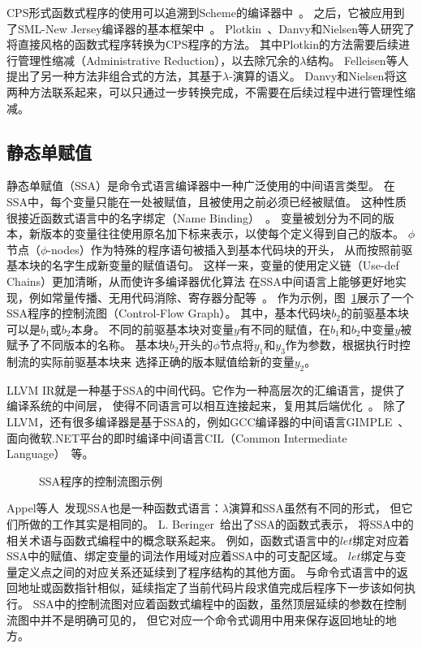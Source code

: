 CPS形式函数式程序的使用可以追溯到Scheme的编译器中~\cite{steele1978rabbit}。
之后，它被应用到了SML-New Jersey编译器的基本框架中~\cite{shao1995type}。
Plotkin~\cite{plotkin1977lcf}、Danvy和Nielsen\cite{danvy2007one}等人研究了将直接风格的函数式程序转换为CPS程序的方法。
其中Plotkin的方法需要后续进行管理性缩减（Administrative Reduction），以去除冗余的$\lambda$结构。
Felleisen等人提出了另一种方法非组合式的方法，其基于$\lambda$-演算的语义。
Danvy和Nielsen将这两种方法联系起来，可以只通过一步转换完成，不需要在后续过程中进行管理性缩减。


\subsection{静态单赋值} \label{sec:bg_ssa}

静态单赋值（SSA）是命令式语言编译器中一种广泛使用的中间语言类型。
在SSA中，每个变量只能在一处被赋值，且被使用之前必须已经被赋值。
这种性质很接近函数式语言中的名字绑定（Name Binding）~\cite{ssabook}。
变量被划分为不同的版本，新版本的变量往往使用原名加下标来表示，以使每个定义得到自己的版本。
$\phi$节点（$\phi$-nodes）作为特殊的程序语句被插入到基本代码块的开头，
从而按照前驱基本块的名字生成新变量的赋值语句。
这样一来，变量的使用定义链（Use-def Chains）更加清晰，从而使许多编译器优化算法
在SSA中间语言上能够更好地实现，例如常量传播、无用代码消除、寄存器分配等~\cite{ssabook,kelsey1995correspondence}。
作为示例，图~\ref{ssacfg}展示了一个SSA程序的控制流图（Control-Flow Graph）。
其中，基本代码块$b_2$的前驱基本块可以是$b_1$或$b_2$本身。
不同的前驱基本块对变量$y$有不同的赋值，在$b_1$和$b_2$中变量$y$被赋予了不同版本的名称。
基本块$b_2$开头的$\phi$节点将$y_1$和$y_3$作为参数，根据执行时控制流的实际前驱基本块来
选择正确的版本赋值给新的变量$y_2$。

LLVM IR就是一种基于SSA的中间代码。它作为一种高层次的汇编语言，提供了编译系统的中间层，
使得不同语言可以相互连接起来，复用其后端优化~\cite{lattner2006introduction}。
除了LLVM，还有很多编译器是基于SSA的，例如GCC编译器的中间语言GIMPLE~\cite{callanan2007extending}、
面向微软.NET平台的即时编译中间语言CIL（Common Intermediate Language）~\cite{thai2003net}等。

\begin{figure}[htbp]
    \centering
    
    \caption{SSA程序的控制流图示例}\label{ssacfg}
\end{figure}

Appel等人~\cite{appel1998ssa}发现SSA也是一种函数式语言：$\lambda$演算和SSA虽然有不同的形式，
但它们所做的工作其实是相同的。
L. Beringer~\cite{ssabook}给出了SSA的函数式表示，
将SSA中的相关术语与函数式编程中的概念联系起来。
例如，函数式语言中的$let$绑定对应着SSA中的赋值、绑定变量的词法作用域对应着SSA中的可支配区域。
$let$绑定与变量定义点之间的对应关系还延续到了程序结构的其他方面。
与命令式语言中的返回地址或函数指针相似，延续指定了当前代码片段求值完成后程序下一步该如何执行。
SSA中的控制流图对应着函数式编程中的函数，虽然顶层延续的参数在控制流图中并不是明确可见的，
但它对应一个命令式调用中用来保存返回地址的地方。

